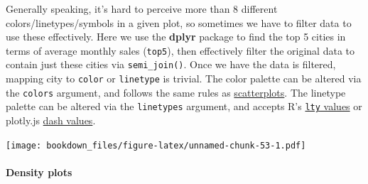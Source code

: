\documentclass[12pt,]{isuthesis}
\newenvironment{Shaded}{\begin{snugshade}}{\end{snugshade}}
\newcommand{\KeywordTok}[1]{\textcolor[rgb]{0.13,0.29,0.53}{\textbf{{#1}}}}
\newcommand{\DataTypeTok}[1]{\textcolor[rgb]{0.13,0.29,0.53}{{#1}}}
\newcommand{\DecValTok}[1]{\textcolor[rgb]{0.00,0.00,0.81}{{#1}}}
\newcommand{\StringTok}[1]{\textcolor[rgb]{0.31,0.60,0.02}{{#1}}}
\newcommand{\OtherTok}[1]{\textcolor[rgb]{0.56,0.35,0.01}{{#1}}}
\newcommand{\NormalTok}[1]{{#1}}
\let\oldparagraph\paragraph
\renewcommand{\paragraph}[1]{\oldparagraph{#1}\mbox{}}
\begin{document}
Generally speaking, it's hard to perceive more than 8 different
colors/linetypes/symbols in a given plot, so sometimes we have to filter
data to use these effectively. Here we use the \textbf{dplyr} package to
find the top 5 cities in terms of average monthly sales (\texttt{top5}),
then effectively filter the original data to contain just these cities
via \texttt{semi\_join()}. Once we have the data is filtered, mapping
city to \texttt{color} or \texttt{linetype} is trivial. The color
palette can be altered via the \texttt{colors} argument, and follows the
same rules as \protect\hyperlink{scatterplots}{scatterplots}. The
linetype palette can be altered via the \texttt{linetypes} argument, and
accepts R's
\href{https://github.com/wch/r-source/blob/e5b21d0397c607883ff25cca379687b86933d730/src/library/graphics/man/par.Rd\#L726-L743}{\texttt{lty}
values} or plotly.js
\href{https://plot.ly/r/reference/\#scatter-line-dash}{dash values}.

\begin{Shaded}
\end{Shaded}

\texttt{[image: bookdown\_files/figure-latex/unnamed-chunk-53-1.pdf]}

\paragraph{Density plots}\label{density-plots-1}
\end{document}
